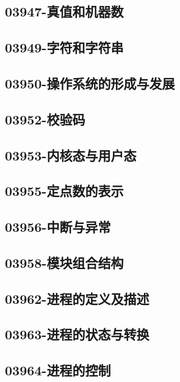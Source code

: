 \subsection{03947-真值和机器数}

\subsection{03949-字符和字符串}

\subsection{03950-操作系统的形成与发展}

\subsection{03952-校验码}

\subsection{03953-内核态与用户态}

\subsection{03955-定点数的表示}

\subsection{03956-中断与异常}

\subsection{03958-模块组合结构}

\subsection{03962-进程的定义及描述}

\subsection{03963-进程的状态与转换}

\subsection{03964-进程的控制}

